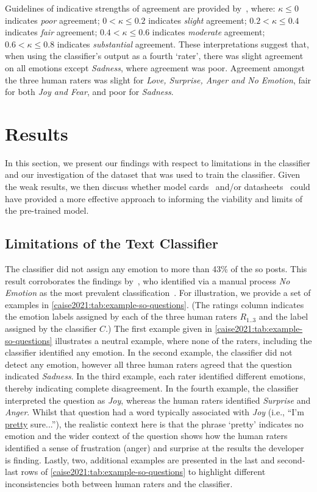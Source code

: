 Guidelines of indicative strengths of agreement are provided by~\citet{Landis:1977kv}, where: $\kappa \leq 0$ indicates \textit{poor} agreement; $0 < \kappa \leq 0.2$ indicates \textit{slight} agreement; $0.2 < \kappa \leq 0.4$ indicates \textit{fair} agreement; $0.4 < \kappa \leq 0.6$ indicates \textit{moderate} agreement; $0.6 < \kappa \leq 0.8$ indicates \textit{substantial} agreement. These interpretations suggest that, when using the classifier's output as a fourth `rater', there was slight agreement on all emotions except \textit{Sadness}, where agreement was poor.  Agreement amongst the three human raters was slight for \textit{Love, Surprise, Anger and No Emotion}, fair for both \textit{Joy and Fear}, and poor for \textit{Sadness}. 

\section{Results}\label{caise2021:SubSection:Findings}
In this section, we present our findings with respect to limitations in the classifier and our investigation of the dataset that was used to train the classifier. Given the weak results, we then  discuss whether model cards~\citep{Mitchell:2018in} and/or datasheets~\citep{Gebru:2018wh} could have provided a more effective approach to informing the viability and limits of the pre-trained model.

\subsection{Limitations of the Text Classifier}
The classifier did not assign any emotion to more than 43\% of the \gls{so} posts.  This result corroborates the findings by~\citeauthor{murgia2014}, who identified via a manual process \textit{No Emotion} as the most prevalent classification~\citep{murgia2014}. For illustration, we provide a set of examples in \cref{caise2021:tab:example-so-questions}. (The ratings column indicates the emotion labels assigned by each of the three human raters $R_{1..3}$ and the label assigned by the classifier $C$.) 
The first example given in \cref{caise2021:tab:example-so-questions} illustrates a neutral example, where none of the raters, including the classifier identified any emotion.  
In the second example, the classifier did not detect any emotion, however all three human raters agreed that the question indicated \textit{Sadness}. 
In the third example, each rater identified different emotions, thereby indicating complete disagreement.
In the fourth example, the classifier interpreted the question as \textit{Joy}, whereas the human raters identified \textit{Surprise} and \textit{Anger}. Whilst that question had a word typically associated with \textit{Joy} (i.e., ``I'm \uline{pretty} sure...''), the realistic context here is that the phrase `pretty' indicates no emotion and the wider context of the question shows how the human raters identified a sense of frustration (anger) and surprise at the results the developer is finding.
Lastly, two, additional examples are presented in the last and second-last rows of \cref{caise2021:tab:example-so-questions} to highlight different inconsistencies both between human raters and the classifier.

